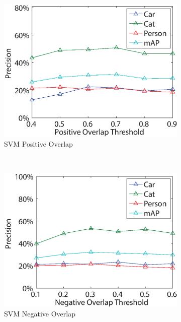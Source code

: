 \documentclass[10pt,twocolumn,letterpaper]{article}
\begin{document}
\begin{figure}
        \begin{subfigure}[b]{0.24\textwidth}
        \includegraphics[width=\textwidth]{figures/tuning/pos_overlap.eps}
        \caption{SVM Positive Overlap}
        \label{fig:pos_overlap}
        \end{subfigure}%
        ~ 
        \begin{subfigure}[b]{0.24\textwidth}
                \includegraphics[width=\textwidth]{figures/tuning/neg_overlap.eps}
                \caption{SVM Negative Overlap}
                \label{fig:neg_overlap}
        \end{subfigure}
        ~ 
        \begin{subfigure}[b]{0.24\textwidth}

\end{subfigure}
\end{figure}
\end{document}
